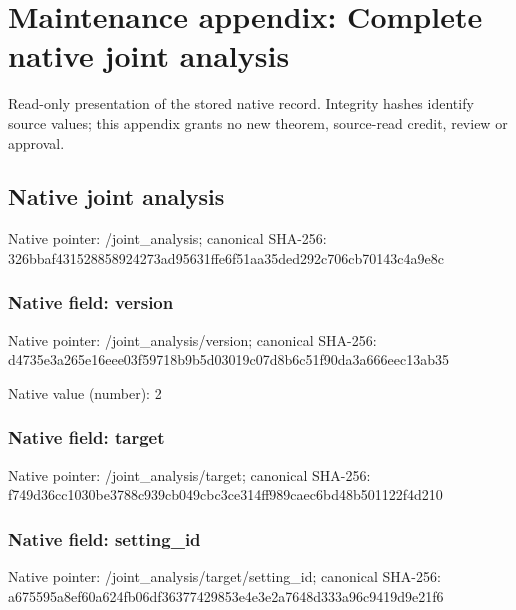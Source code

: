 \documentclass[10pt,a4paper]{article}
\begin{document}
\section{Maintenance appendix: Complete native joint analysis}


Read-only presentation of the stored native record. Integrity hashes identify source values; this appendix grants no new theorem, source-read credit, review or approval.



\subsection{Native joint analysis}


Native pointer: /joint\_analysis; canonical SHA-256: 326bbaf431528858924273ad\allowbreak{}95631ffe6f51aa35ded292c7\allowbreak{}06cb70143c4a9e8c



\subsubsection{Native field: version}


Native pointer: /joint\_analysis/version; canonical SHA-256: d4735e3a265e16eee03f5971\allowbreak{}8b9b5d03019c07d8b6c51f90\allowbreak{}da3a666eec13ab35



Native value (number): 2



\subsubsection{Native field: target}


Native pointer: /joint\_analysis/target; canonical SHA-256: f749d36cc1030be3788c939c\allowbreak{}b049cbc3ce314ff989caec6b\allowbreak{}d48b501122f4d210



\subsubsection{Native field: setting\_id}


Native pointer: /joint\_analysis/target/setting\_id; canonical SHA-256: a675595a8ef60a624fb06df3\allowbreak{}6377429853e4e3e2a7648d33\allowbreak{}3a96c9419d9e21f6
\end{document}
